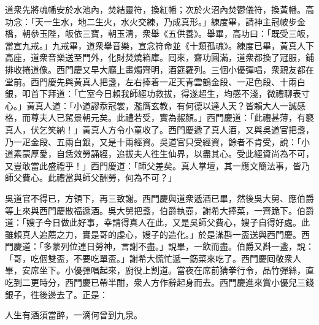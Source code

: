 道衆先將魂幡安於水池內，焚結靈符，換紅幡；次於火沼內焚鬱儀符，換黃幡。高功念：「天一生水，地二生火，水火交練，乃成真形。」練度畢，請神主冠帔步金橋，朝叅玉陛，皈依三寶，朝玉清，衆舉《五供養》。舉畢，高功曰：「既受三皈，當宣九戒。」九戒畢，道衆舉音樂，宣念符命並《十類孤魂》。練度已畢，黃真人下高座，道衆音樂送至門外，化財焚燒箱庫。囘來，齋功圓滿，{}道衆都換了冠服，鋪排收捲道像。西門慶又早大廳上畫燭齊明，酒筵羅列。三個小優彈唱，衆親友都在堂前。西門慶先與黃真人把盞，左右捧着一疋天青雲鶴金段、一疋色段、十兩白銀，叩首下拜道：「亡室今日賴我師經功救拔，得遂超生，均感不淺，微禮聊表寸心。」黃真人道：「小道謬忝冠裳，濫膺玄教，有何德以達人天？皆賴大人一誠感格，而尊夫人已駕景朝元矣。此禮若受，實為赧顏。」西門慶道：「此禮甚薄，有褻真人，伏乞笑納！」黃真人方令小童收了。西門慶遞了真人酒，又與吳道官把盞，乃一疋金段、五兩白銀，又是十兩經資。吳道官只受經資，餘者不肯受，說：「小道素蒙厚愛，自恁效勞誦經，追拔夫人徃生仙界，以盡其心。受此經資尚為不可，又豈敢當此盛禮乎！」西門慶道：「師父差矣。真人掌壇，其一應文簡法事，皆乃師父費心。此禮當與師父酬勞，何為不可？」

吳道官不得已，方領下，再三致謝。西門慶與道衆遞酒已畢，然後吳大舅、應伯爵等上來與西門慶散福遞酒。吳大舅把盞，伯爵執壺，謝希大捧菜，一齊跪下。伯爵道：「嫂子今日做此好事，幸請得真人在此，又是吳師父費心，嫂子自得好處。此雖賴真人追薦之力，實是哥的虔心，嫂子的造化。」於是滿斟一盃送與西門慶。西門慶道：「多蒙列位連日勞神，言謝不盡。」{}說畢，一飲而盡。伯爵又斟一盞，說：「哥，吃個雙盃，不要吃單盃。」謝希大慌忙遞一筯菜來吃了。西門慶囘敬衆人畢，安席坐下。小優彈唱起來，廚役上割道。當夜在席前猜拳行令，品竹彈絲，直吃到二更時分，西門慶已帶半酣，衆人方作辭起身而去。西門慶進來賞小優兒三錢銀子，徃後邊去了。正是：

\begin{myquote}
人生有酒須當醉，一滴何曾到九泉。
\end{myquote}

